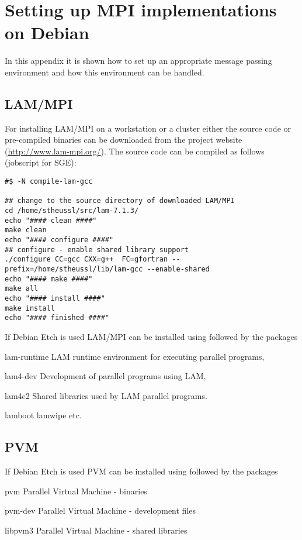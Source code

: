 
\section{Setting up MPI implementations on Debian}
\label{app:mpi_imp}

In this appendix it is shown how to set up an appropriate message
passing environment and how this environment can be handled.

\subsection{LAM/MPI}

For installing LAM/MPI on a workstation or a cluster
either the source code or pre-compiled binaries can be downloaded from
the project website (\url{http://www.lam-mpi.org/}).
The source code can be compiled as follows (jobscript for SGE):

\begin{verbatim}
#$ -N compile-lam-gcc

## change to the source directory of downloaded LAM/MPI
cd /home/stheussl/src/lam-7.1.3/
echo "#### clean ####"
make clean
echo "#### configure ####"
## configure - enable shared library support
./configure CC=gcc CXX=g++  FC=gfortran --prefix=/home/stheussl/lib/lam-gcc --enable-shared
echo "#### make ####"
make all
echo "#### install ####"
make install
echo "#### finished ####"
\end{verbatim}

If Debian Etch is used LAM/MPI can be installed using  followed by the packages

\begin{Description}
\item[lam-runtime] LAM runtime environment for executing parallel programs,
\item[lam4-dev] Development of parallel programs using LAM,
\item[lam4c2] Shared libraries used by LAM parallel programs.
\end{Description}

lamboot lamwipe etc.




\subsection{PVM}



If Debian Etch is used PVM can be installed using  followed by the packages

\begin{Description}
\item[pvm] Parallel Virtual Machine - binaries 
\item[pvm-dev] Parallel Virtual Machine - development files
\item[libpvm3] Parallel Virtual Machine - shared libraries
\end{Description}
